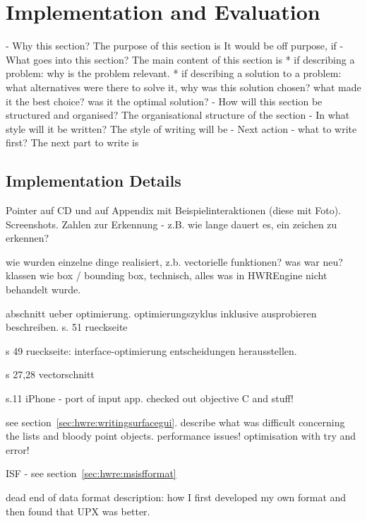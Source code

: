 
\chapter{Implementation and Evaluation}

- Why this section? 
  The purpose of this section is 
  It would be off purpose, if 
- What goes into this section?
  The main content of this section is 
  * if describing a problem: why is the problem relevant.
  * if describing a solution to a problem: what alternatives were
    there to solve it, why was this solution chosen? 
    what made it the best choice? was it the optimal solution?
- How will this section be structured and organised?
  The organisational structure of the section 
- In what style will it be written?
  The style of writing will be 
- Next action - what to write first?
  The next part to write is

\section{Implementation Details}
Pointer auf CD und auf Appendix mit Beispielinteraktionen (diese mit Foto).
Screenshots.
Zahlen zur Erkennung - z.B. wie lange dauert es, ein zeichen zu erkennen?

wie wurden einzelne dinge realisiert, z.b. vectorielle funktionen?
was war neu?
klassen wie box / bounding box, technisch, alles was in HWREngine nicht behandelt
wurde.

abschnitt ueber optimierung.
optimierungszyklus inklusive ausprobieren beschreiben.
s. 51 rueckseite

s 49 rueckseite: interface-optimierung
entscheidungen herausstellen. 

s 27,28 vectorschnitt

s.11 iPhone - port of input app. checked out objective C and stuff!

see section~\ref{sec:hwre:writingsurfacegui}. describe what was difficult concerning the lists and bloody point objects.
performance issues! optimisation with try and error!

ISF - see section~\ref{sec:hwre:msisfformat}

dead end of data format description:
how I first developed my own format and then found that
UPX was better.


